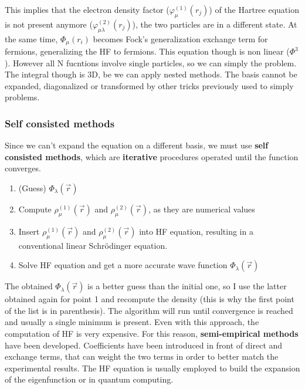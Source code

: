 		This implies that the electron density factor ($\varphi^{(1)}_\mu(r_j)$) of the Hartree equation is not present anymore ($\varphi^{(2)}_{\mu\lambda}(r_j)$), the two particles are in a different state.
		At the same time, $\Phi_\mu(r_i)$ becomes Fock's generalization exchange term for fermions, generalizing the HF to fermions.
		This equation though is non linear ($\Phi^3$).
		However all N fucntions involve single particles, so we can simply the problem.
		The integral though is 3D, be we can apply nested methods.
		The basis cannot be expanded, diagonalized or transformed by other tricks previously used to simply problems.

		\subsubsection{Self consisted methods}
		Since we can't expand the equation on a different basis, we must use \textbf{self consisted methods}, which are \textbf{iterative} procedures operated until the function converges.

		\begin{multicols}{2}
			\begin{enumerate}
				\item (Guess) $\Phi_\lambda (\vec{r})$
				\item Compute $\rho_\mu^{(1)}(\vec{r})$ and $\rho_\mu^{(2)}(\vec{r})$, as they are numerical values
				\item Insert $\rho_\mu^{(1)}(\vec{r})$ and $\rho_\mu^{(2)}(\vec{r})$ into HF equation, resulting in a conventional linear Schr\"odinger equation.
				\item Solve HF equation and get a more accurate wave function $\Phi_\lambda (\vec{r})$
			\end{enumerate}
		\end{multicols}

		The obtained $\Phi_\lambda (\vec{r})$ is a better guess than the initial one, so I use the latter obtained again for point 1 and recompute the density (this is why the first point of the list is in parenthesis).
		The algorithm will run until convergence is reached and usually a single minimum is present.
		Even with this approach, the computation of HF is very expensive.
		For this reason, \textbf{semi-empirical methods} have been developed.
		Coefficients have been introduced in front of direct and exchange terms, that can weight the two terms in order to better match the experimental results.
		The HF equation is usually employed to build the expansion of the eigenfunction or in quantum computing.

